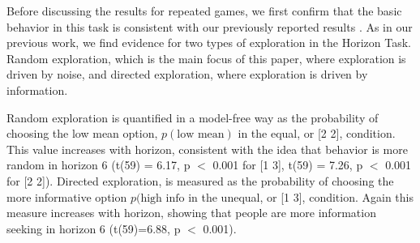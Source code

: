 \documentclass[12pt]{article}
\begin{document}
	
	
	Before discussing the results for repeated games, we first confirm that the basic behavior in this task is consistent with our previously reported results \citep{wilson2014}. As in our previous work, we find evidence for two types of exploration in the Horizon Task.  Random exploration, which is the main focus of this paper, where exploration is driven by noise, and directed exploration, where exploration is driven by information. 
	
	Random exploration is quantified in a model-free way as the probability of choosing the low mean option, $p(\mbox{low mean})$ in the equal, or [2 2], condition. This value increases with horizon, consistent with the idea that behavior is more random in horizon 6 (t(59) = 6.17, p $<$ 0.001 for [1 3], t(59) = 7.26, p $<$ 0.001 for [2 2]).  Directed exploration, is measured as the probability of choosing the more informative option $p(\mbox{high info}$ in the unequal, or [1 3], condition. Again this measure increases with horizon, showing that people are more information seeking in horizon 6 (t(59)=6.88, p $<$ 0.001).
	
\end{document}
